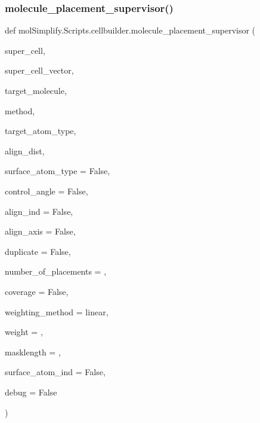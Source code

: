 \mbox{\label{namespacemolSimplify_1_1Scripts_1_1cellbuilder_aa9abfba7f941a53e708aa37cafbaf039}} 
\subsubsection{\texorpdfstring{molecule\+\_\+placement\+\_\+supervisor()}{molecule\_placement\_supervisor()}}
{\footnotesize\ttfamily def mol\+Simplify.\+Scripts.\+cellbuilder.\+molecule\+\_\+placement\+\_\+supervisor (\begin{DoxyParamCaption}\item[{}]{super\+\_\+cell,  }\item[{}]{super\+\_\+cell\+\_\+vector,  }\item[{}]{target\+\_\+molecule,  }\item[{}]{method,  }\item[{}]{target\+\_\+atom\+\_\+type,  }\item[{}]{align\+\_\+dist,  }\item[{}]{surface\+\_\+atom\+\_\+type = {\ttfamily False},  }\item[{}]{control\+\_\+angle = {\ttfamily False},  }\item[{}]{align\+\_\+ind = {\ttfamily False},  }\item[{}]{align\+\_\+axis = {\ttfamily False},  }\item[{}]{duplicate = {\ttfamily False},  }\item[{}]{number\+\_\+of\+\_\+placements = {},  }\item[{}]{coverage = {\ttfamily False},  }\item[{}]{weighting\+\_\+method = {\ttfamily \textquotesingle{}linear\textquotesingle{}},  }\item[{}]{weight = {},  }\item[{}]{masklength = {},  }\item[{}]{surface\+\_\+atom\+\_\+ind = {\ttfamily False},  }\item[{}]{debug = {\ttfamily False} }\end{DoxyParamCaption})}

